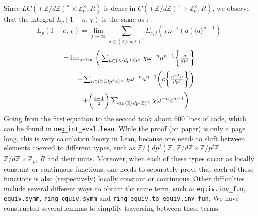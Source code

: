 \documentclass[a4paper,UKenglish,cleveref, autoref, thm-restate,pdfa]{lipics-v2021}
\newcommand{\lean}[1]{\texttt{#1}\xspace} %
\begin{document}
Since $LC((\mathbb{Z}/d \mathbb{Z})^{\times} \times \mathbb{Z}_p^{\times}, R)$ is dense in $C((\mathbb{Z}/d \mathbb{Z})^{\times} \times \mathbb{Z}_p^{\times}, R)$, 
we observe that the integral $L_p (1 - n, \chi)$ is the same as :
$$ L_p (1 - n, \chi) = \lim_{j \to \infty} \sum_{a \in (\mathbb{Z}/ d p^j \mathbb{Z})^{\times}} E_{c, j} (\chi \omega^{-1} (a) \langle a \rangle ^{n - 1}) $$
\begin{equation}\label{eqn:3}
$$ = \lim_{j \to \infty} \bigg ( \sum_{a \in (\mathbb{Z}/ d p^j \mathbb{Z})^{\times}} \chi \omega^{-n} a^{n - 1} \bigg \{ \frac{a}{d p^j} \bigg \} $$
\end{equation}
\begin{equation}\label{eqn:4}
$$\qquad - \sum_{a \in (\mathbb{Z}/ d p^j \mathbb{Z})^{\times}} \chi \omega^{-n} a^{n - 1} \bigg ( c \bigg \{ \frac{c^{-1} a}{d p^j} \bigg \} \bigg ) $$
\end{equation}
\begin{equation}\label{eqn:5}
$$\qquad + \bigg ( \frac{c - 1}{2} \bigg ) \sum_{a \in (\mathbb{Z}/ d p^j \mathbb{Z})^{\times}} \chi \omega^{-n} a^{n - 1} \bigg ) $$
\end{equation}
Going from the first equation to the second took about 600 lines of code, which can be found in \href{https://github.com/laughinggas/p-adic-L-functions/blob/main/src/neg_int_eval.lean}{\lean{neg\_int\_eval.lean}}. While the proof (on paper) is only a page long, 
this is very calculation heavy in Lean, because one needs to shift between elements coerced to different types, such as $\mathbb{Z}/ (d p^j) \mathbb{Z}$, 
$\mathbb{Z}/ d \mathbb{Z} \times \mathbb{Z}/ p^j \mathbb{Z}$, $\mathbb{Z}/ d \mathbb{Z} \times \mathbb{Z}_p$, $R$ and their units. Moreover, when each of these types occur 
as locally constant or continuous functions, one needs to separately prove that each of these functions 
is also (respectively) locally constant or continuous. Other difficulties include several different ways to obtain the same term, such as \lean{equiv.inv\_fun}, 
\lean{equiv.symm}, \lean{ring\_equiv.symm} and \lean{ring\_equiv.to\_equiv.inv\_fun}. We have constructed several lemmas to simplify traversing between these terms. 
\end{document}
